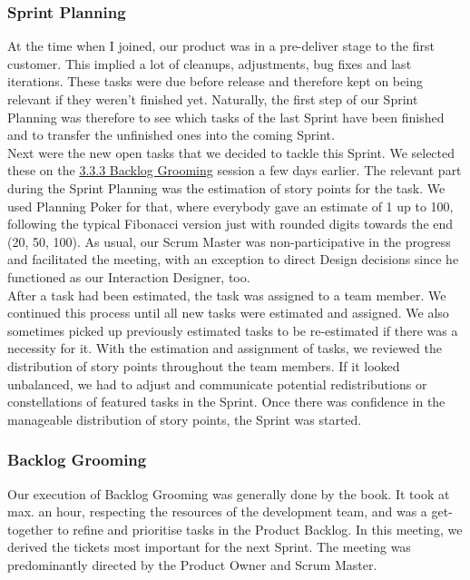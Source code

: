 \documentclass[a4paper]{article}
\begin{document}
\subsubsection{Sprint Planning}
At the time when I joined, our product was in a pre-deliver stage to the first customer. 
This implied a lot of cleanups, adjustments, bug fixes and last iterations. 
These tasks were due before release and therefore kept on being relevant if they weren’t finished yet. 
Naturally, the first step of our Sprint Planning was therefore to see which tasks of the last Sprint have been finished and to transfer the unfinished ones into the coming Sprint. 
\\\linebreak
Next were the new open tasks that we decided to tackle this Sprint. 
We selected these on the \hyperref[sec:grooming]{3.3.3 Backlog Grooming} session a few days earlier. 
The relevant part during the Sprint Planning was the estimation of story points for the task. 
We used Planning Poker for that, where everybody gave an estimate of 1 up to 100, following the typical Fibonacci version just with rounded digits towards the end (20, 50, 100). 
As usual, our Scrum Master was non-participative in the progress and facilitated the meeting, with an exception to direct Design decisions since he functioned as our Interaction Designer, too.
\\\linebreak
After a task had been estimated, the task was assigned to a team member. 
We continued this process until all new tasks were estimated and assigned. 
We also sometimes picked up previously estimated tasks to be re-estimated if there was a necessity for it. 
With the estimation and assignment of tasks, we reviewed the distribution of story points throughout the team members. 
If it looked unbalanced, we had to adjust and communicate potential redistributions or constellations of featured tasks in the Sprint. 
Once there was confidence in the manageable distribution of story points, the Sprint was started.

\subsubsection{Backlog Grooming}
\label{sec:grooming}
Our execution of Backlog Grooming was generally done by the book. 
It took at max. an hour, respecting the resources of the development team, and was a get-together to refine and prioritise tasks in the Product Backlog. 
In this meeting, we derived the tickets most important for the next Sprint. 
The meeting was predominantly directed by the Product Owner and Scrum Master.
\end{document}
